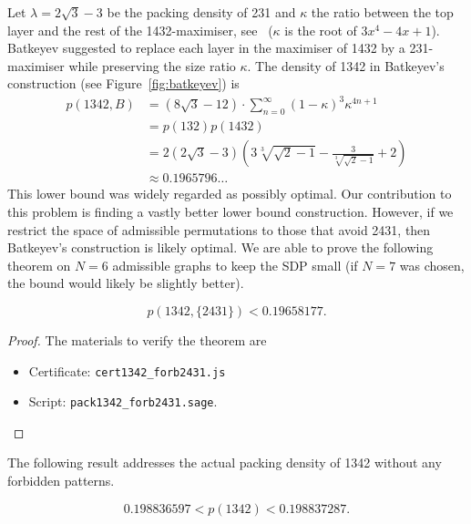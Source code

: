 Let $\lambda = 2\sqrt{3}-3$ be the packing density of 231 and $\kappa$ the ratio between the top layer  and the rest of the 1432-maximiser, see~\cite{price1997packing} ($\kappa$ is the root of $3x^4-4x+1$). Batkeyev suggested to replace each layer in the maximiser of 1432 by a 231-maximiser while preserving the size ratio $\kappa$. The density of 1342 in Batkeyev's construction (see Figure~\ref{fig:batkeyev}) is 
\begin{align*}
p(1342, B) &=(8 \sqrt{3}-12)\cdot \sum _{n=0}^{\infty } (1-\kappa)^3 \kappa ^{4n+1} \\
           &= p(132)p(1432)\\
           &= 2 \left(2 \sqrt{3}-3\right) \left(3 \sqrt[3]{\sqrt{2}-1}-\frac{3}{\sqrt[3]{\sqrt{2}-1}}+2\right)\\
           &\approx 0.1965796\ldots
\end{align*}
This lower bound was widely regarded as possibly optimal. Our contribution to this problem is finding a vastly better lower bound construction. However, if we restrict the space of admissible permutations to those that avoid 2431, then Batkeyev's construction is likely optimal. We are able to prove the following theorem on $N=6$ admissible graphs to keep the SDP small (if $N=7$ was chosen, the bound would likely be slightly better).

\begin{theorem}
$$p(1342,\{2431\}) < 0.19658177.$$
\end{theorem}
\begin{proof}The materials to verify the theorem are
  \begin{itemize}
  \item Certificate: \texttt{cert1342\_forb2431.js}
  \item Script: \texttt{pack1342\_forb2431.sage}.
  \end{itemize}
\end{proof}

The following result addresses the actual packing density of 1342 without any forbidden patterns.
\begin{theorem}
\label{thm:newbounds1342}
$$0.198836597 < p(1342) < 0.198837287.$$
\end{theorem}

